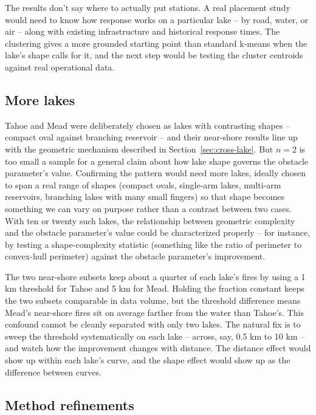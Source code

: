 \documentclass[11pt]{article}
\begin{document}
The results don't say where to actually put stations. A real placement study would need to know how response works on a particular lake -- by road, water, or air -- along with existing infrastructure and historical response times. The clustering gives a more grounded starting point than standard k-means when the lake's shape calls for it, and the next step would be testing the cluster centroids against real operational data.

\subsection{More lakes}
\label{sec:more-lakes}

Tahoe and Mead were deliberately chosen as lakes with contrasting shapes -- compact oval against branching reservoir -- and their near-shore results line up with the geometric mechanism described in Section~\ref{sec:cross-lake}. But $n = 2$ is too small a sample for a general claim about how lake shape governs the obstacle parameter's value. Confirming the pattern would need more lakes, ideally chosen to span a real range of shapes (compact ovals, single-arm lakes, multi-arm reservoirs, branching lakes with many small fingers) so that shape becomes something we can vary on purpose rather than a contrast between two cases. With ten or twenty such lakes, the relationship between geometric complexity and the obstacle parameter's value could be characterized properly -- for instance, by testing a shape-complexity statistic (something like the ratio of perimeter to convex-hull perimeter) against the obstacle parameter's improvement.

The two near-shore subsets keep about a quarter of each lake's fires by using a 1 km threshold for Tahoe and 5 km for Mead. Holding the fraction constant keeps the two subsets comparable in data volume, but the threshold difference means Mead's near-shore fires sit on average farther from the water than Tahoe's. This confound cannot be cleanly separated with only two lakes. The natural fix is to sweep the threshold systematically on each lake -- across, say, 0.5 km to 10 km -- and watch how the improvement changes with distance. The distance effect would show up within each lake's curve, and the shape effect would show up as the difference between curves.
 
\subsection{Method refinements}
\label{sec:method-refine}
 
\end{document}
